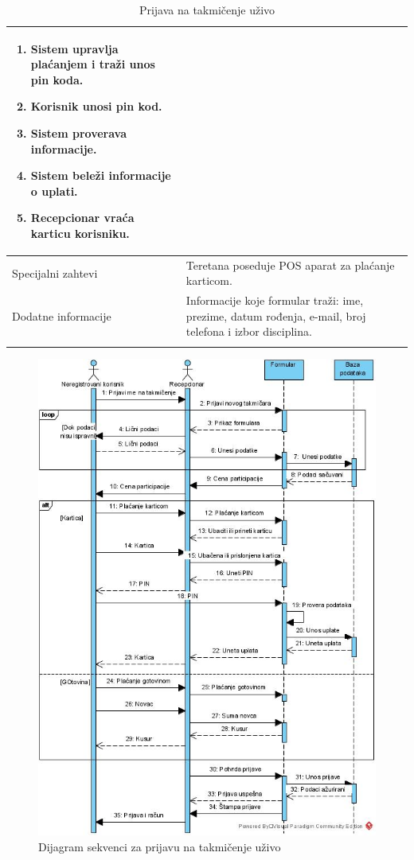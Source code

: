 \documentclass[../../main.tex]{subfiles}
\begin{document}
\begin{longtable}{| p{} | p{} |}
\begin{itemize}
\begin{enumerate}
            \item Sistem upravlja plaćanjem i traži unos pin koda.
            \item Korisnik unosi pin kod.
            \item Sistem proverava informacije.
            \item Sistem beleži informacije o uplati.
            \item Recepcionar vraća karticu korisniku.	
        \end{enumerate}
    \end{itemize}\\
\hline
    Specijalni zahtevi & Teretana poseduje POS aparat za plaćanje karticom.\\
\hline
    Dodatne informacije & Informacije koje formular traži: ime, prezime, datum rođenja, e-mail, broj telefona i izbor disciplina.\\
\hline
\caption{Prijava na takmičenje uživo} %
\end{longtable}

\begin{figure}[!ht]
\begin{center}
\includegraphics[scale=0.55]{sections/images/takmicenje_prijava_uzivo_dijagram_sekvenci.jpg}
\end{center}
\caption{Dijagram sekvenci za prijavu na takmičenje uživo}
\label{fig:kontekst}
\end{figure}
\end{document}
